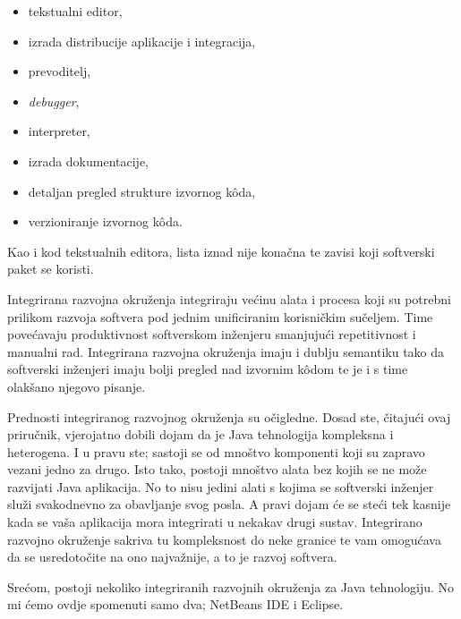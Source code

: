 \begin{itemize}
    \item tekstualni editor,
    \item izrada distribucije aplikacije i integracija,
    \item prevoditelj,
    \item \emph{debugger},
    \item interpreter,
    \item izrada dokumentacije,
    \item detaljan pregled strukture izvornog kôda,
    \item verzioniranje izvornog kôda.
\end{itemize}

Kao i kod tekstualnih editora, lista iznad nije konačna te zavisi koji softverski paket se koristi.

\begin{infobox}
    Integrirana razvojna okruženja integriraju većinu alata i procesa koji su potrebni prilikom razvoja softvera pod jednim unificiranim korisničkim sučeljem. Time povećavaju produktivnost softverskom inženjeru smanjujući repetitivnost i manualni rad. Integrirana razvojna okruženja imaju i dublju semantiku tako da softverski inženjeri imaju bolji pregled nad izvornim kôdom te je i s time olakšano njegovo pisanje.
\end{infobox}

Prednosti integriranog razvojnog okruženja su očigledne. Dosad ste, čitajući ovaj priručnik, vjerojatno dobili dojam da je Java tehnologija kompleksna i heterogena. I u pravu ste; sastoji se od mnoštvo komponenti koji su zapravo vezani jedno za drugo. Isto tako, postoji mnoštvo alata bez kojih se ne može razvijati Java aplikacija. No to nisu jedini alati s kojima se softverski inženjer služi svakodnevno za obavljanje svog posla. A pravi dojam će se steći tek kasnije kada se vaša aplikacija mora integrirati u nekakav drugi sustav. Integrirano razvojno okruženje sakriva tu kompleksnost do neke granice te vam omogućava da se usredotočite na ono najvažnije, a to je razvoj softvera.

Srećom, postoji nekoliko integriranih razvojnih okruženja za Java tehnologiju. No mi ćemo ovdje spomenuti samo dva; NetBeans IDE i Eclipse.

